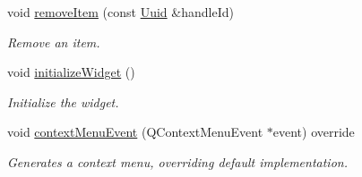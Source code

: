 \begin{Indent}
\begin{DoxyCompactItemize}
void \mbox{\hyperlink{classrev_1_1_view_1_1_resource_tree_widget_a7a2a954ca8d729857a65839ce2102483}{remove\+Item}} (const \mbox{\hyperlink{classrev_1_1_uuid}{Uuid}} \&handle\+Id)
\begin{DoxyCompactList}\small\item\em Remove an item. \end{DoxyCompactList}\item 
\mbox{\label{classrev_1_1_view_1_1_resource_tree_widget_afd3949a1c53ac10d3ea0f7ec0502b805}} 
void \mbox{\hyperlink{classrev_1_1_view_1_1_resource_tree_widget_afd3949a1c53ac10d3ea0f7ec0502b805}{initialize\+Widget}} ()
\begin{DoxyCompactList}\small\item\em Initialize the widget. \end{DoxyCompactList}\item 
void \mbox{\hyperlink{classrev_1_1_view_1_1_resource_tree_widget_ac565478e3b3f618414c7a1762bfd86c7}{context\+Menu\+Event}} (Q\+Context\+Menu\+Event $\ast$event) override
\begin{DoxyCompactList}\small\item\em Generates a context menu, overriding default implementation. \end{DoxyCompactList}\end{DoxyCompactItemize}
\end{Indent}
